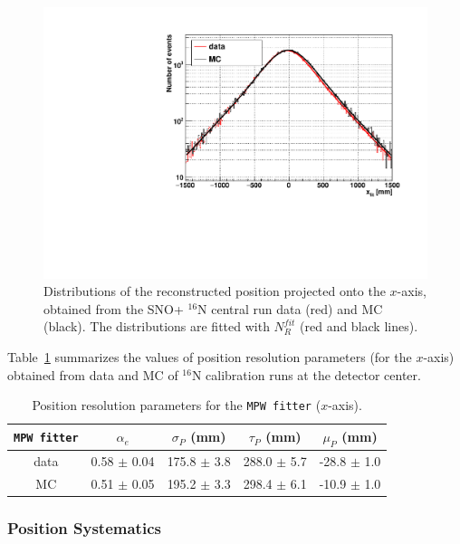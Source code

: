 \begin{figure}
	\centering
	\includegraphics[width=12cm]{posResol.pdf}
	\caption[Distributions of the reconstructed position projected onto the $x$-axis.]{Distributions of the reconstructed position projected onto the $x$-axis, obtained from the SNO+ {$^{16}$}N central run data (red) and MC (black). The distributions are fitted with $N_R^{fit}$ (red and black lines).	\label{fig:posresol}}
\end{figure}

Table~\ref{tab:posresol} summarizes the values of position resolution parameters (for the $x$-axis) obtained from data and MC of {$^{16}$}N calibration runs at the detector center.
\begin{table}[ht]
	\centering
	\caption{Position resolution parameters for the \texttt{MPW fitter} ($x$-axis).	\label{tab:posresol}}
	\vspace{2mm}
	\begin{tabular}{ccccc}
		\toprule
		\texttt{MPW fitter} & $\alpha_e$ & $\sigma_P$ (mm) & $\tau_P$ (mm)& $\mu_P$ (mm)\\
		\midrule
		data& 0.58 $\pm$ 0.04 & 175.8 $\pm$ 3.8 & 288.0 $\pm$ 5.7 & -28.8 $\pm$ 1.0\\
		\hline 
		MC & 0.51 $\pm$ 0.05 & 195.2 $\pm$ 3.3 & 298.4 $\pm$ 6.1 & -10.9 $\pm$ 1.0\\
		\bottomrule
	\end{tabular}
\end{table}
\vspace{1mm}

\subsubsection{Position Systematics}\label{sect:posSystematics}

